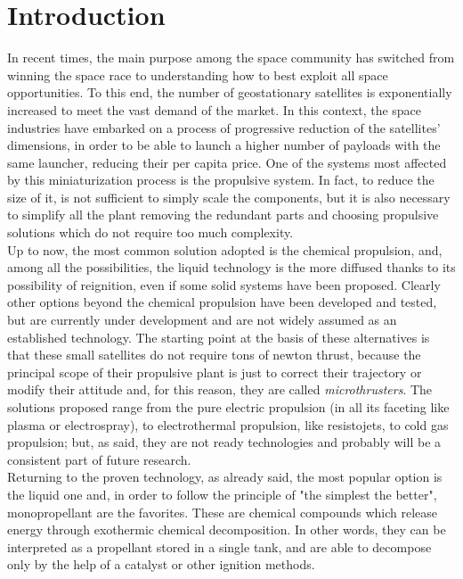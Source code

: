 \documentclass[a4paper]{report}
\begin{document}
\chapter{Introduction}

In recent times, the main purpose among the space community has switched from winning the space race to understanding how to best exploit all space opportunities. To this end, the number of geostationary satellites is exponentially increased to meet the vast demand of the market. In this context, the space industries have embarked on a process of progressive reduction of the satellites' dimensions, in order to be able to launch a higher number of payloads with the same launcher, reducing their per capita price. One of the systems most affected by this miniaturization process is the propulsive system. In fact, to reduce the size of it, is not sufficient to simply scale the components, but it is also necessary to simplify all the plant removing the redundant parts and choosing propulsive solutions which do not require too much complexity.\\
Up to now, the most common solution adopted is the chemical propulsion, and, among all the possibilities, the liquid technology is the more diffused thanks to its possibility of reignition, even if some solid systems have been proposed. Clearly other options beyond the chemical propulsion have been developed and tested, but are currently under development and are not widely assumed as an established technology. The starting point at the basis of these alternatives is that these small satellites do not require tons of newton thrust, because the principal scope of their propulsive plant is just to correct their trajectory or modify their attitude and, for this reason, they are called \textit{microthrusters}. The solutions proposed range from the pure electric propulsion (in all its faceting like plasma or electrospray), to electrothermal propulsion, like resistojets, to cold gas propulsion; but, as said, they are not ready technologies and probably will be a consistent part of future research. \\%
Returning to the proven technology, as already said, the most popular option is the liquid one and, in order to follow the principle of "the simplest the better", monopropellant are the favorites. These are chemical compounds which release energy through exothermic chemical decomposition. In other words, they can be interpreted as a propellant stored in a single tank, and are able to decompose only by the help of a catalyst or other ignition methods. \\ %
\end{document}
